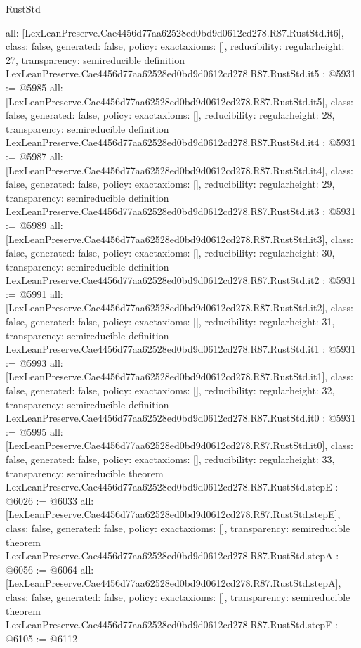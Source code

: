 \begin{lexlean}{RustStd}
\begin{coremodule}
{  all: [LexLeanPreserve.Cae4456d77aa62528ed0bd9d0612cd278.R87.RustStd.it6],
  class: false,
  generated: false,
  policy: exact{axioms: []},
  reducibility: regular{height: 27},
  transparency: semireducible
}
definition LexLeanPreserve.Cae4456d77aa62528ed0bd9d0612cd278.R87.RustStd.it5 : @5931 := @5985 {
  all: [LexLeanPreserve.Cae4456d77aa62528ed0bd9d0612cd278.R87.RustStd.it5],
  class: false,
  generated: false,
  policy: exact{axioms: []},
  reducibility: regular{height: 28},
  transparency: semireducible
}
definition LexLeanPreserve.Cae4456d77aa62528ed0bd9d0612cd278.R87.RustStd.it4 : @5931 := @5987 {
  all: [LexLeanPreserve.Cae4456d77aa62528ed0bd9d0612cd278.R87.RustStd.it4],
  class: false,
  generated: false,
  policy: exact{axioms: []},
  reducibility: regular{height: 29},
  transparency: semireducible
}
definition LexLeanPreserve.Cae4456d77aa62528ed0bd9d0612cd278.R87.RustStd.it3 : @5931 := @5989 {
  all: [LexLeanPreserve.Cae4456d77aa62528ed0bd9d0612cd278.R87.RustStd.it3],
  class: false,
  generated: false,
  policy: exact{axioms: []},
  reducibility: regular{height: 30},
  transparency: semireducible
}
definition LexLeanPreserve.Cae4456d77aa62528ed0bd9d0612cd278.R87.RustStd.it2 : @5931 := @5991 {
  all: [LexLeanPreserve.Cae4456d77aa62528ed0bd9d0612cd278.R87.RustStd.it2],
  class: false,
  generated: false,
  policy: exact{axioms: []},
  reducibility: regular{height: 31},
  transparency: semireducible
}
definition LexLeanPreserve.Cae4456d77aa62528ed0bd9d0612cd278.R87.RustStd.it1 : @5931 := @5993 {
  all: [LexLeanPreserve.Cae4456d77aa62528ed0bd9d0612cd278.R87.RustStd.it1],
  class: false,
  generated: false,
  policy: exact{axioms: []},
  reducibility: regular{height: 32},
  transparency: semireducible
}
definition LexLeanPreserve.Cae4456d77aa62528ed0bd9d0612cd278.R87.RustStd.it0 : @5931 := @5995 {
  all: [LexLeanPreserve.Cae4456d77aa62528ed0bd9d0612cd278.R87.RustStd.it0],
  class: false,
  generated: false,
  policy: exact{axioms: []},
  reducibility: regular{height: 33},
  transparency: semireducible
}
theorem LexLeanPreserve.Cae4456d77aa62528ed0bd9d0612cd278.R87.RustStd.stepE : @6026 := @6033 {
  all: [LexLeanPreserve.Cae4456d77aa62528ed0bd9d0612cd278.R87.RustStd.stepE],
  class: false,
  generated: false,
  policy: exact{axioms: []},
  transparency: semireducible
}
theorem LexLeanPreserve.Cae4456d77aa62528ed0bd9d0612cd278.R87.RustStd.stepA : @6056 := @6064 {
  all: [LexLeanPreserve.Cae4456d77aa62528ed0bd9d0612cd278.R87.RustStd.stepA],
  class: false,
  generated: false,
  policy: exact{axioms: []},
  transparency: semireducible
}
theorem LexLeanPreserve.Cae4456d77aa62528ed0bd9d0612cd278.R87.RustStd.stepF : @6105 := @6112 {
}
\end{coremodule}
\end{lexlean}
